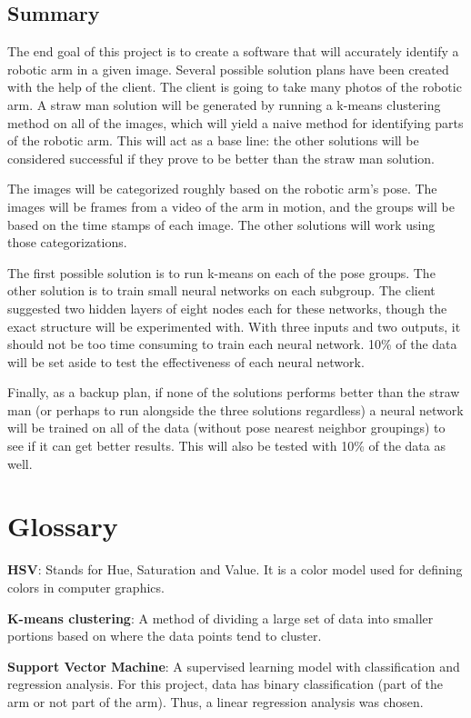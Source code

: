 \documentclass[10pt,journal,compsoc, draftclsnofoot,onecolumn]{IEEEtran}
\begin{document}
\subsection{Summary}
The end goal of this project is to create a software that will accurately identify a robotic arm in a given image.
Several possible solution plans have been created with the help of the client.
The client is going to take many photos of the robotic arm.
A straw man solution will be generated by running a k-means clustering method on all of the images, which will yield a naive method for identifying parts of the robotic arm.
This will act as a base line: the other solutions will be considered successful if they prove to be better than the straw man solution.

The images will be categorized roughly based on the robotic arm's pose.
The images will be frames from a video of the arm in motion, and the groups will be based on the time stamps of each image.
The other solutions will work using those categorizations.

The first possible solution is to run k-means on each of the pose groups.
The other solution is to train small neural networks on each subgroup. The client suggested two hidden layers of eight nodes each for these networks, though the exact structure will be experimented with.
With three inputs and two outputs, it should not be too time consuming to train each neural network.
10\% of the data will be set aside to test the effectiveness of each neural network.

Finally, as a backup plan, if none of the solutions performs better than the straw man (or perhaps to run alongside the three solutions regardless) a neural network will be trained on all of the data (without pose nearest neighbor groupings) to see if it can get better results.
This will also be tested with 10\% of the data as well.

\section{Glossary}
\textbf{HSV}: Stands for Hue, Saturation and Value. It is a color model used for defining colors in computer graphics.

\textbf{K-means clustering}: A method of dividing a large set of data into smaller portions based on where the data points tend to cluster.

\textbf{Support Vector Machine}: A supervised learning model with classification and regression analysis.
For this project, data has binary classification (part of the arm or not part of the arm).
Thus, a linear regression analysis was chosen.
\end{document}
